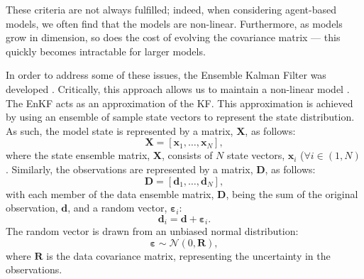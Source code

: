 \documentclass[12pt, twoside, a4paper]{article}
\begin{document}
These criteria are not always fulfilled; indeed, when considering agent-based
models, we often find that the models are non-linear.
Furthermore, as models grow in dimension, so does the cost of evolving the
covariance matrix --- this quickly becomes intractable for larger models.

In order to address some of these issues, the Ensemble Kalman Filter was
developed \citep{evensen2003ensemble, evensen2009ensemble}.
Critically, this approach allows us to maintain a non-linear model
\citep{wikle2007bayesian}.
The EnKF acts as an approximation of the KF.
This approximation is achieved by using an ensemble of sample state vectors to
represent the state distribution.
As such, the model state is represented by a matrix, $\mathbf{X}$, as follows:
\begin{equation}
    \mathbf{X} = \left[ \mathbf{x}_1, \ldots, \mathbf{x}_N \right],
\end{equation}
where the state ensemble matrix, $\mathbf{X}$, consists of $N$ state vectors,
$\mathbf{x}_i$ ($\forall i \in (1, N)$.
Similarly, the observations are represented by a matrix, $\mathbf{D}$, as
follows:
\begin{equation}
    \mathbf{D} = \left[ \mathbf{d}_1, \ldots, \mathbf{d}_N \right],
\end{equation}
with each member of the data ensemble matrix, $\mathbf{D}$, being the sum of the
original observation, $\mathbf{d}$, and a random vector,
$\mathbf{\varepsilon}_i$:
\begin{equation}
    \mathbf{d}_i = \mathbf{d} + \mathbf{\varepsilon}_i.
\end{equation}
The random vector is drawn from an unbiased normal distribution:
\begin{equation}
    \mathbf{\varepsilon} \sim \mathcal{N} 
                              \left( 0, \mathbf{R} \right),
\end{equation}
where $\mathbf{R}$ is the data covariance matrix, representing the uncertainty
in the observations.
\end{document}
